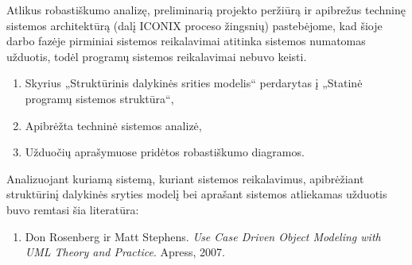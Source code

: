 \documentclass{VUMIFPSkursinis}
\begin{document}
			Atlikus robastiškumo analizę, preliminarią projekto peržiūrą ir apibrežus techninę sistemos architektūrą (dalį ICONIX proceso žingsnių) pastebėjome, kad šioje darbo fazėje pirminiai sistemos reikalavimai atitinka sistemos numatomas užduotis, todėl programų sistemos reikalavimai nebuvo keisti.
			
			\begin{enumerate}
				\item Skyrius „Struktūrinis dalykinės srities modelis“ perdarytas į „Statinė programų sistemos struktūra“,
				\item Apibrėžta techninė sistemos analizė,
				\item Užduočių aprašymuose pridėtos robastiškumo diagramos.
			\end{enumerate}
        Analizuojant kuriamą sistemą, kuriant sistemos reikalavimus, apibrėžiant struktūrinį dalykinės sryties modelį bei aprašant sistemos atliekamas užduotis buvo remtasi šia literatūra:
            \begin{enumerate}
                \item Don Rosenberg ir Matt Stephens. \textit{Use Case Driven Object Modeling with UML Theory and Practice}. Apress, 2007.
            \end{enumerate}
      
    
\end{document}
